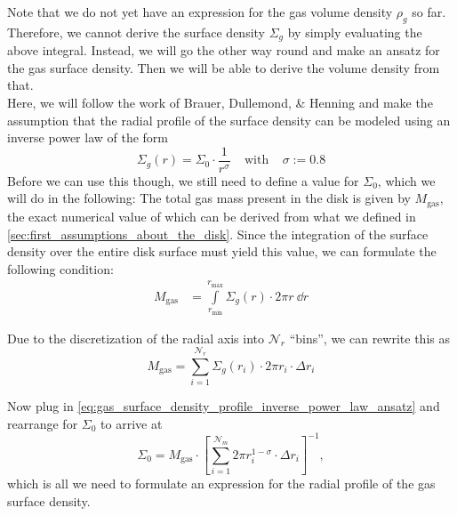        Note that we do not yet have an expression for the gas volume density $\rho_g$ so far.
        Therefore, we cannot derive the surface density $\Sigma_g$ by simply evaluating the above
        integral. Instead, we will go the other way round and make an ansatz for the gas surface
        density. Then we will be able to derive the volume density from that. \\

        Here, we will 
        follow the work of Brauer, Dullemond, \& Henning \cite{brauer_dullemond_henning_2007}
        and make the assumption that the radial profile of the surface density can be 
        modeled using an inverse power law of the form
        \begin{equation}
            \label{eq:gas_surface_density_profile_inverse_power_law_ansatz}
            \Sigma_g(r) = \Sigma_0\cdot\frac{1}{r^\sigma}
            \ \ \ \ \ \text{with}\ \ \ \ \
            \sigma := 0.8
        \end{equation}  %
        Before we can use this though, we still need to define a value for $\Sigma_0$, 
        which we will do in the following: 
        The total gas mass present in the disk is given by $M_\text{gas}$, the exact numerical value 
        of which can be derived from what we defined in
        \cref{sec:first_assumptions_about_the_disk}. Since the integration of the surface density 
        over the entire disk surface must yield this value, we can formulate the following 
        condition:
        \begin{align}
            M_\text{gas}
                &= \int\limits_{r_\text{min}}^{r_\text{max}} \Sigma_g(r) \cdot 2\pi r \ \dd r
        \end{align}

        Due to the discretization of the radial axis into $\mathcal N_r$ ``bins'', we can rewrite 
        this as
        \begin{equation}
            M_\text{gas} = \sum_{i=1}^{\mathcal N_r} \Sigma_g(r_i) \cdot 2\pi r_i \cdot \Delta r_i
        \end{equation}

        Now plug in \cref{eq:gas_surface_density_profile_inverse_power_law_ansatz} and 
        rearrange for $\Sigma_0$ to arrive at
        \begin{equation}
            \Sigma_0
                = M_\text{gas} \cdot \left[
                    \sum_{i=1}^{\mathcal N_m} 2\pi r_i^{1-\sigma} \cdot \Delta r_i
                \right]^{-1},
        \end{equation}
        which is all we need to formulate an expression for the radial profile of the gas surface density.

